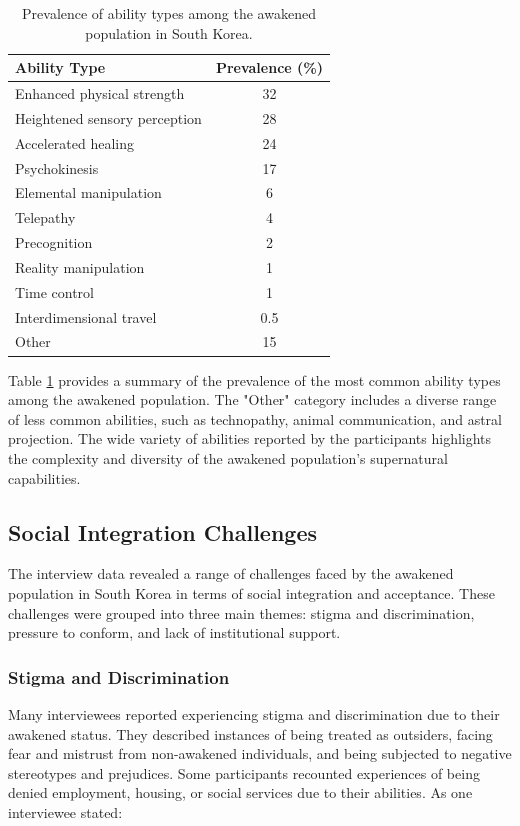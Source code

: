 \documentclass[12pt, a4paper]{article}
\begin{document}
\begin{table}[h]
\centering
\begin{tabular}{lc}
\hline
Ability Type & Prevalence (\%) \\
\hline
Enhanced physical strength & 32 \\
Heightened sensory perception & 28 \\
Accelerated healing & 24 \\
Psychokinesis & 17 \\
Elemental manipulation & 6 \\
Telepathy & 4 \\
Precognition & 2 \\
Reality manipulation & 1 \\
Time control & 1 \\
Interdimensional travel & 0.5 \\
Other & 15 \\
\hline
\end{tabular}
\caption{Prevalence of ability types among the awakened population in South Korea.}
\label{tab:ability_prev}
\end{table}

Table \ref{tab:ability_prev} provides a summary of the prevalence of the most common ability types among the awakened population. The "Other" category includes a diverse range of less common abilities, such as technopathy, animal communication, and astral projection. The wide variety of abilities reported by the participants highlights the complexity and diversity of the awakened population's supernatural capabilities.

\subsection{Social Integration Challenges}
The interview data revealed a range of challenges faced by the awakened population in South Korea in terms of social integration and acceptance. These challenges were grouped into three main themes: stigma and discrimination, pressure to conform, and lack of institutional support.

\subsubsection{Stigma and Discrimination}
Many interviewees reported experiencing stigma and discrimination due to their awakened status. They described instances of being treated as outsiders, facing fear and mistrust from non-awakened individuals, and being subjected to negative stereotypes and prejudices. Some participants recounted experiences of being denied employment, housing, or social services due to their abilities. As one interviewee stated:
\end{document}
